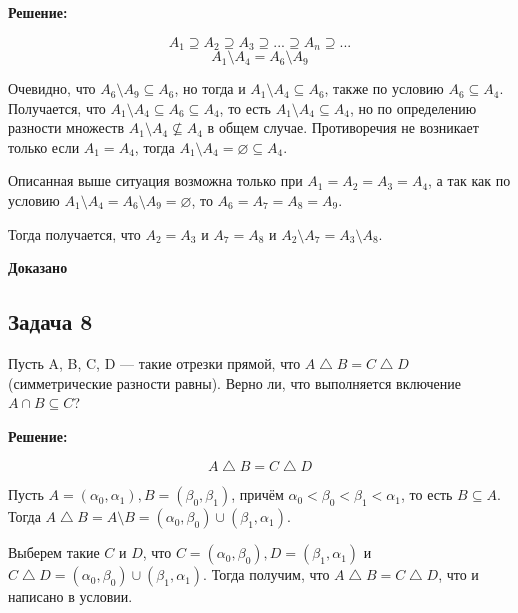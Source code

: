 \documentclass[a4paper,14pt]{article} %
\begin{document}
\begin{center}
\bfseries
{\Large Решение: }
\end{center}


\[A_1\supseteq A_2 \supseteq A_3 \supseteq ... \supseteq A_n \supseteq ...\]
\[A_1 \setminus A_4 = A_6 \setminus A_9\]

Очевидно, что $A_6 \setminus A_9 \subseteq A_6$, но тогда и $A_1 \setminus A_4 \subseteq A_6$, также по условию $A_6 \subseteq A_4$. Получается, что $A_1 \setminus A_4 \subseteq A_6 \subseteq A_4$, то есть $A_1 \setminus A_4  \subseteq A_4$, но по определению разности множеств $A_1 \setminus A_4  \nsubseteq A_4$ в общем случае. Противоречия не возникает только если $A_1 = A_4$, тогда $A_1 \setminus A_4 = \varnothing \subseteq A_4$.

Описанная выше ситуация возможна только при $A_1 = A_2 = A_3 =  A_4$, а так как по условию $A_1 \setminus A_4 = A_6 \setminus A_9 = \varnothing$, то $A_6 = A_7 = A_8 = A_9$.

Тогда получается, что $A_2 = A_3$ и $A_7 = A_8$ и $A_2 \setminus A_7 = A_3 \setminus A_8$. \\


\begin{flushright}
\begin{large}
\textbf {Доказано}
\end{large}
\end{flushright}


\newpage
\begin{center}
\subsection{Задача 8}
\end{center}

Пусть A, B, C, D — такие отрезки прямой, что $A \bigtriangleup B = C \bigtriangleup D$ (симметрические разности равны). Верно ли, что выполняется включение $A \cap B \subseteq C$?
\newpage
\begin{center}
\bfseries
{\Large Решение: }
\end{center}


\[A\bigtriangleup B = C\bigtriangleup D\]

Пусть $A = (\alpha_0, \alpha_1),B = (\beta_0, \beta_1) $, причём $\alpha_0 < \beta_0 < \beta_1 < \alpha_1 $, то есть $B\subseteq A$. Тогда $A \bigtriangleup B = A \setminus B = (\alpha_0, \beta_0)\cup (\beta_1, \alpha_1)$.

Выберем такие $C$ и $D$, что $C =(\alpha_0, \beta_0), D = (\beta_1, \alpha_1)$ и $C \bigtriangleup D =(\alpha_0, \beta_0)\cup (\beta_1, \alpha_1) $. Тогда получим, что $A \bigtriangleup B = C \bigtriangleup D$, что и написано в условии.
\end{document}
